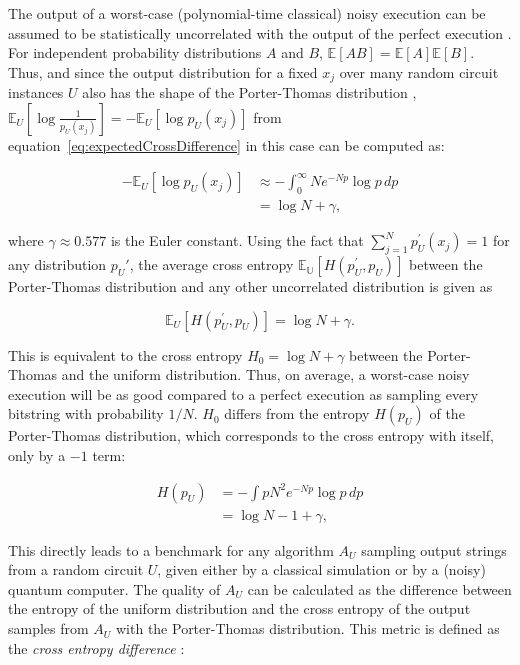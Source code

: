 The output of a worst-case (polynomial-time classical) noisy execution can be assumed to
be statistically uncorrelated with the output of the perfect execution \cite{Boixo2018supremacy}. 
For independent probability distributions $A$ and $B$, $\mathbb{E}[AB] = \mathbb{E}[A] \mathbb{E}[B]$. Thus,
and since the output distribution for a fixed $x_j$ over many random circuit
instances $U$ also has the shape of the Porter-Thomas distribution \cite{harrow2008random},
$\mathbb{E}_U[\log{\frac{1}{p_U(x_j)}}] = -\mathbb{E}_U[\log{p_U(x_j)}]$ from equation~\ref{eq:expectedCrossDifference} 
in this case can be computed as:

\begin{align}
  -\mathbb{E}_U[\log{p_U(x_j)}] &\approx - \int_0^{\infty}Ne^{-Np}\log{p} \,dp \\
                                &= \log{N} + \gamma,
\end{align}

where $\gamma \approx 0.577$ is the Euler constant.
Using the fact that $\sum_{j=1}^Np_U^{\prime}(x_j) = 1$ for any distribution $p_U{\prime}$, the average cross
entropy $\mathbb{E_U}[H(p_U^{\prime},p_U)]$ between the Porter-Thomas distribution and any other uncorrelated distribution is
given as 

\begin{equation}
  \mathbb{E}_U [H(p_U^{\prime},p_U)] = \log{N} + \gamma.
\end{equation}

This is equivalent to the cross entropy $H_0 = \log{N} + \gamma$ between the
Porter-Thomas and the uniform distribution. Thus, on
average, a worst-case noisy execution will be as good compared to a perfect execution as sampling
every bitstring with probability $1/N$. $H_0$ differs from the entropy $H(p_U)$ of
the Porter-Thomas distribution, which corresponds to the cross entropy with
itself, only by a $-1$ term:

\begin{align}
  H(p_U) &= - \int p N^2e^{-Np}\log{p} \, dp \\
         &= \log{N} -1 + \gamma,
\end{align}

This directly leads to a benchmark for any algorithm $A_U$ sampling output strings from a
random circuit $U$, given either by a
classical simulation or by a (noisy) quantum computer. The quality of 
$A_U$ can be calculated as the difference between
the entropy of the uniform distribution and the cross entropy of the output
samples from $A_U$ with the Porter-Thomas distribution. This metric is
defined as the \textit{cross entropy difference} \cite{Boixo2018supremacy}:

